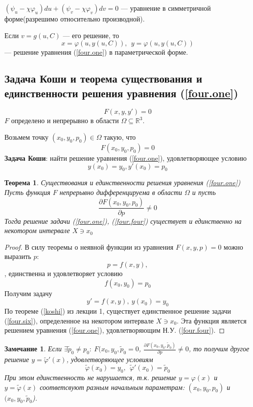 \documentclass{article}
\newtheorem{teo}{Теорема}
\newtheorem*{ntc}{Замечание}
\newcommand{\pd}[2]{\frac{\partial {#1}}{\partial {#2}}}
\newcommand{\re}[1]{(\ref{#1})}
\begin{document}
  $ (\psi_u - \chi\varphi_u)du + (\psi_v - \chi\varphi_v)dv = 0$ --- уравнение в симметричной форме(разрешимо относительно производной).

  Если $v = g(u, C)$ --- его решение, то
  \[ x = \varphi(u, y(u, C)),~~ y = \varphi(u, y(u, C)) \]
  --- решение уравнения \re{four.one} в параметрической форме.

  \subsection{Задача Коши и теорема существования и единственности решения уравнения \re{four.one}}
  \[ F(x, y, y') = 0 \]
  $F$ определено и непрерывно в области $ \Omega \subseteq \mathbb{R}^3$.

  Возьмем точку $(x_0, y_0, p_0) \in \Omega$ такую, что
  \[ F(x_0, y_0, p_0) = 0 \]
  \textbf{Задача Коши}: найти решение уравнения \re{four.one}, удовлетворяющее условию 
  \begin{equation}
  \label{four.four}
  y(x_0) = y_0, y'(x_0) = p_0
  \end{equation}
  \begin{teo}{Существования и единственности решения уравнения \re{four.one}}
  Пусть функция $F$ непрерывно дифференцируема в области $\Omega$ и пусть 
  \begin{equation}
  \pd{F(x_0, y_0, p_0)}{p} \neq 0
  \end{equation}
  Тогда решение задачи \re{four.one}, \re{four.four} существует и единственно на некотором интервале $X \ni x_0$
  \end{teo}
  \begin{proof}
  В силу теоремы о неявной функции из уравнения $F(x, y, p) = 0$ можно выразить $p$:
  \[ p = f(x, y), \]
  , единственна и удовлетворяет условию
  \[ f(x_0, y_0) = p_0 \]
  Получим задачу
  \begin{equation}
  \label{four.six}
  y' = f(x, y),~ y(x_0) = y_0
  \end{equation}
  По теореме \re{koshi} из лекции 1, существует единственное решение задачи \re{four.six}, определенное на некотором интервале $X \ni x_0$. Эта функция является решением уравнения \re{four.one}, удовлетворяющим Н.У. \re{four.four}.
  \end{proof}

  \begin{ntc}
  Если $\exists \tilde{p}_0 \neq p_0:~ F(x_0, y_0, \tilde{p}_0 = 0$, $\pd{F(x_0, y_0, \tilde{p}_0)}{p} \neq 0$, то получим другое решение $y = \tilde{\varphi}'(x)$, удовлетворяющее условиям
  \[ \tilde{\varphi}(x_0) = y_0,~~ \tilde{\varphi}'(x_0) = \tilde{p}_0 \]
  При этом единственность не нарушается, т.к. решение $y = \varphi(x)$ и $y = \tilde{\varphi}(x)$ соответсвуют разным начальным параметрам: $(x_0, y_0, p_0)$ и $(x_0, y_0, \tilde{p}_0$).
  \end{ntc}
\end{document}
